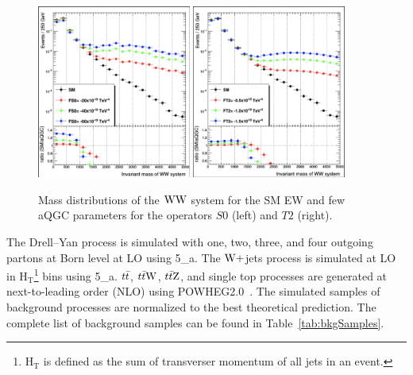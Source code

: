 \begin{figure}[!htbp]
\centering
\includegraphics[width=0.45\textwidth]{Plots/aQGC_Signal_Scaling/mWW_FS0.png}
\includegraphics[width=0.45\textwidth]{Plots/aQGC_Signal_Scaling/mWW_FT2.png}
\caption{Mass distributions of the $\mathrm{W} \mathrm{W}$ system for the SM EW and few aQGC parameters for the operators $S0$ (left) and $T2$ (right).}
\label{fig:aqgc_signal}
\end{figure}



The Drell--Yan process is simulated with one, two, three, and four outgoing partons at Born level at LO using \MADGRAPH{}5\_a\MCATNLO. The $\mathrm{W}+$jets process is simulated at LO in $\mathrm{H_{T}}$\footnote{$\mathrm{H_T}$ is defined as the sum of transverser momentum of all jets in an event.} bins using \MADGRAPH{}5\_a\MCATNLO. $t\bar{t}$, $t\bar{t} \mathrm{W}$, $t\bar{t} \mathrm{Z}$, and single top processes are generated at next-to-leading order (NLO) using \textsc{POWHEG2.0}~\cite{Alioli:2008gx,Nason:2004rx,Frixione:2007vw,powheg:2010}. The simulated samples of background processes are normalized to the best theoretical prediction. The complete list of background samples can be found in Table~\ref{tab:bkgSamples}.

